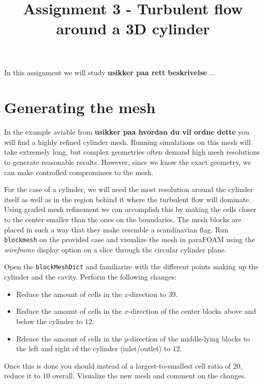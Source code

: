 \documentclass[a4paper,english,12pt]{article}
\begin{document}
\title{Assignment 3 - Turbulent flow around a 3D cylinder}
\author{}
\date{}
\maketitle

In this assignment we will study \textbf{usikker paa rett beskrivelse} ... 

\section*{Generating the mesh}

In the example aviable from \textbf{usikker paa hvordan du vil ordne dette} you will find a highly refined cylinder mesh. Running simulations on this mesh will take extremely long, but complex
geometries often demand high mesh resolutions to generate reasonable results. However, since we know the exact geometry, we can make controlled compromisses to the mesh. 

For the case of a cylinder, we will need the most resolution around the cylinder itself as well as in the region behind it where the turbulent flow will dominate. 
Using graded mesh refinement we can accomplish this by making the cells closer to the center smaller than the ones on the boundaries. The mesh blocks are placed in such a way that they make
resemble a scandinavian flag. Run \verb+blockmesh+ on the provided case and visualize the mesh in paraFOAM using the \textit{wireframe} display option on a slice through the circular cylinder plane. 



Open the \verb+blockMeshDict+ and familiarize with the different points making up the cylinder and the cavity. Perform the following changes:

\begin{itemize}
 \item Reduce the amount of cells in the $z$-direction to $39$.
 \item Reduce the amount of cells in the $x$-direction of the center blocks above and below the cylinder to $12$.
 \item Rdeuce the amount of cells in the $y$-direction of the middle-lying blocks to the left and right of the cylinder (inlet/outlet) to $12$.
\end{itemize}

Once this is done you should instead of a largest-to-smallest cell ratio of $20$, reduce it to $10$ overall. Visualize the new mesh and comment on the changes. 
\end{document}

